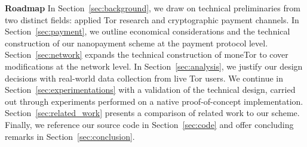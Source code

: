 \textbf{Roadmap} In Section~\ref{sec:background}, we draw on technical
preliminaries from two distinct fields: applied Tor research and cryptographic
payment channels.
In Section~\ref{sec:payment}, we outline economical considerations and the
technical construction of our nanopayment scheme at the payment protocol level.
Section~\ref{sec:network} expands the technical construction of moneTor to cover
modifications at the network level. In Section~\ref{sec:analysis}, we justify
our design decisions with real-world data collection from live Tor users. We
continue in Section~\ref{sec:experimentations} with a validation of the
technical design, carried out through experiments performed on a native
proof-of-concept implementation. Section~\ref{sec:related_work} presents a
comparison of related work to our scheme. Finally, we reference our source code
in Section~\ref{sec:code} and offer concluding remarks in
Section~\ref{sec:conclusion}.


